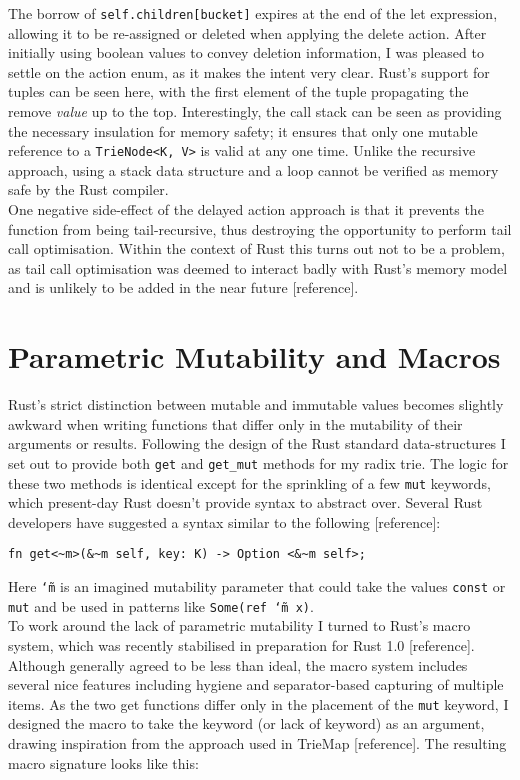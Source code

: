 \documentclass[a4paper,12pt]{article}
\newcommand{\code}{\texttt}
\newcommand{\tildex}{\char`\~}
\begin{document}
The borrow of \code{self.children[bucket]} expires at the end of the let expression, allowing it to be re-assigned or deleted when applying the delete action. After initially using boolean values to convey deletion information, I was pleased to settle on the action enum, as it makes the intent very clear. Rust's support for tuples can be seen here, with the first element of the tuple propagating the remove \textit{value} up to the top. Interestingly, the call stack can be seen as providing the necessary insulation for memory safety; it ensures that only one mutable reference to a \code{TrieNode<K, V>} is valid at any one time. Unlike the recursive approach, using a stack data structure and a loop cannot be verified as memory safe by the Rust compiler.\\

One negative side-effect of the delayed action approach is that it prevents the function from being tail-recursive, thus destroying the opportunity to perform tail call optimisation. Within the context of Rust this turns out not to be a problem, as tail call optimisation was deemed to interact badly with Rust's memory model and is unlikely to be added in the near future [reference].

\section{Parametric Mutability and Macros}

Rust's strict distinction between mutable and immutable values becomes slightly awkward when writing functions that differ only in the mutability of their arguments or results. Following the design of the Rust standard data-structures I set out to provide both \code{get} and \code{get\_mut} methods for my radix trie. The logic for these two methods is identical except for the sprinkling of a few \code{mut} keywords, which present-day Rust doesn't provide syntax to abstract over. Several Rust developers have suggested a syntax similar to the following [reference]:

\begin{verbatim}
fn get<~m>(&~m self, key: K) -> Option <&~m self>;
\end{verbatim}

Here \code{\tildex m} is an imagined mutability parameter that could take the values \code{const} or \code{mut} and be used in patterns like \code{Some(ref \tildex m x)}.\\

To work around the lack of parametric mutability I turned to Rust's macro system, which was recently stabilised in preparation for Rust 1.0 [reference]. Although generally agreed to be less than ideal, the macro system includes several nice features including hygiene and separator-based capturing of multiple items. As the two get functions differ only in the placement of the \code{mut} keyword, I designed the macro to take the keyword (or lack of keyword) as an argument, drawing inspiration from the approach used in TrieMap [reference]. The resulting macro signature looks like this:
\end{document}
